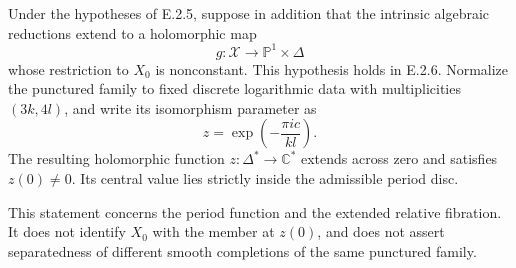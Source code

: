 \begin{proposition}
Under the hypotheses of E.2.5, suppose in addition that the
intrinsic algebraic reductions extend to a holomorphic map
\[
 g:\mathcal X\longrightarrow\mathbb P^1\times\Delta
\]
whose restriction to $X_0$ is nonconstant.  This hypothesis
holds in E.2.6.  Normalize the punctured family to fixed
discrete logarithmic data with multiplicities $(3k,4l)$, and
write its isomorphism parameter as
\[
 z=\exp\!\left(-\frac{\pi i c}{kl}\right).
\]
The resulting holomorphic function $z:\Delta^*\to\mathbb C^*$
extends across zero and satisfies $z(0)\ne0$.  Its central
value lies strictly inside the admissible period disc.

This statement concerns the period function and the extended
relative fibration.  It does not identify $X_0$ with the
member at $z(0)$, and does not assert separatedness of
different smooth completions of the same punctured family.
\end{proposition}
